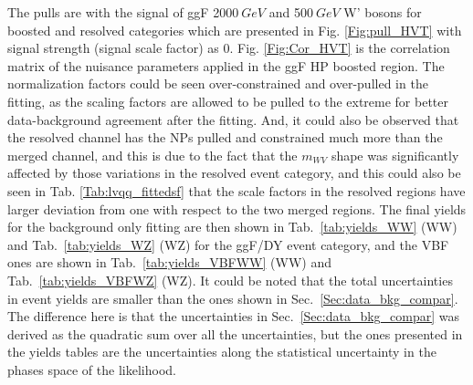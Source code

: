 The pulls are with the signal of ggF 2000$~GeV$ and 500$~GeV$ W' bosons for boosted and resolved categories which are presented in Fig. \ref{Fig:pull_HVT} with signal strength (signal scale factor) as 0. Fig. \ref{Fig:Cor_HVT} is the correlation matrix of the nuisance parameters applied in the ggF HP boosted region. The normalization factors could be seen over-constrained and over-pulled in the fitting, as the scaling factors are allowed to be pulled to the extreme for better data-background agreement after the fitting. And, it could also be observed that the resolved channel has the NPs pulled and constrained much more than the merged channel, and this is due to the fact that the $m_{WV}$ shape was significantly affected by those variations in the resolved event category, and this could also be seen in Tab. \ref{Tab:lvqq_fittedsf} that the scale factors in the resolved regions have larger deviation from one with respect to the two merged regions. The final yields for the background only fitting are then shown in Tab.~\ref{tab:yields_WW} (WW) and Tab.~\ref{tab:yields_WZ} (WZ) for the ggF/DY event category, and the VBF ones are shown in Tab.~\ref{tab:yields_VBFWW} (WW) and Tab.~\ref{tab:yields_VBFWZ} (WZ). It could be noted that the total uncertainties in event yields are smaller than the ones shown in Sec.~\ref{Sec:data_bkg_compar}. The difference here is that the uncertainties in Sec.~\ref{Sec:data_bkg_compar} was derived as the quadratic sum over all the uncertainties, but the ones presented in the yields tables are the uncertainties along the statistical uncertainty in the phases space of the likelihood.  
